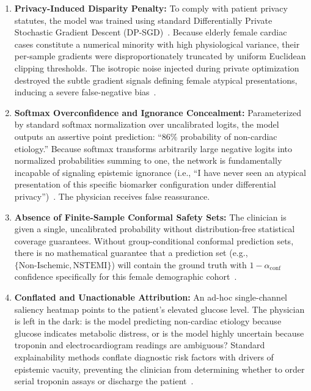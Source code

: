 \documentclass[pdflatex,sn-vancouver-num,referee,lineno]{sn-jnl}
\theoremstyle{thmstyleone}
\theoremstyle{thmstylethree}
\begin{document}
\begin{enumerate}
    \item \textbf{Privacy-Induced Disparity Penalty:} To comply with patient privacy statutes, the model was trained using standard Differentially Private Stochastic Gradient Descent (DP-SGD)~\cite{abadi2016deep}. Because elderly female cardiac cases constitute a numerical minority with high physiological variance, their per-sample gradients were disproportionately truncated by uniform Euclidean clipping thresholds. The isotropic noise injected during private optimization destroyed the subtle gradient signals defining female atypical presentations, inducing a severe false-negative bias~\cite{bagdasaryan2019differential,suriyakumar2021chasing}.
    \item \textbf{Softmax Overconfidence and Ignorance Concealment:} Parameterized by standard softmax normalization over uncalibrated logits, the model outputs an assertive point prediction: ``86\% probability of non-cardiac etiology.'' Because softmax transforms arbitrarily large negative logits into normalized probabilities summing to one, the network is fundamentally incapable of signaling epistemic ignorance (i.e., ``I have never seen an atypical presentation of this specific biomarker configuration under differential privacy'')~\cite{sensoy2018evidential,bengs2022pitfalls}. The physician receives false reassurance.
    \item \textbf{Absence of Finite-Sample Conformal Safety Sets:} The clinician is given a single, uncalibrated probability without distribution-free statistical coverage guarantees. Without group-conditional conformal prediction sets, there is no mathematical guarantee that a prediction set (e.g., $\{\text{Non-Ischemic}, \text{NSTEMI}\}$) will contain the ground truth with $1-\alpha_{\text{conf}}$ confidence specifically for this female demographic cohort~\cite{angelopoulos2021gentle,vovk2005algorithmic}.
    \item \textbf{Conflated and Unactionable Attribution:} An ad-hoc single-channel saliency heatmap points to the patient's elevated glucose level. The physician is left in the dark: is the model predicting non-cardiac etiology because glucose indicates metabolic distress, or is the model highly uncertain because troponin and electrocardiogram readings are ambiguous? Standard explainability methods conflate diagnostic risk factors with drivers of epistemic vacuity, preventing the clinician from determining whether to order serial troponin assays or discharge the patient~\cite{antoran2021clue,hullermeier2021aleatoric}.
\end{enumerate}
\end{document}
